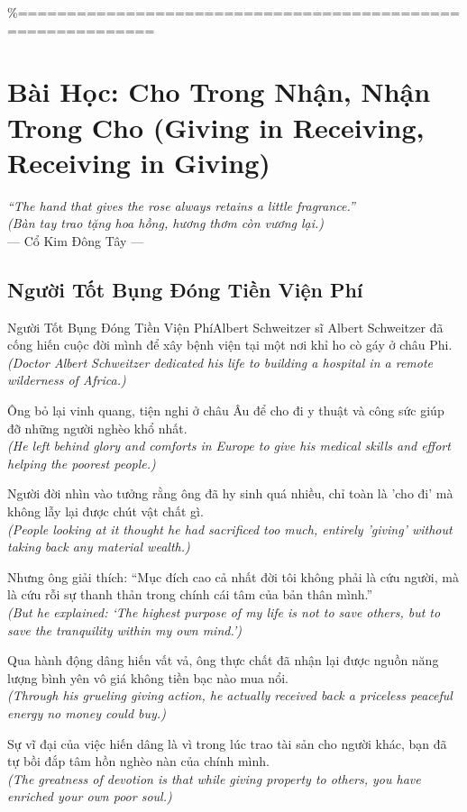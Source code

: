 \%============================================================
\chapter{Bài Học: Cho Trong Nhận, Nhận Trong Cho (Giving in Receiving, Receiving in Giving)}
\begin{center}
  \textit{\color{truyengold}``The hand that gives the rose always retains a little fragrance.''}\\[4pt]
  \textit{(Bàn tay trao tặng hoa hồng, hương thơm còn vương lại.)}\\[4pt]
  \small\color{truyenblue}--- Cổ Kim Đông Tây ---
\end{center}
\ngancach

\section{Người Tốt Bụng Đóng Tiền Viện Phí}
\begin{truyen}{Người Tốt Bụng Đóng Tiền Viện Phí}{Albert Schweitzer}
 sĩ Albert Schweitzer đã cống hiến cuộc đời mình để xây bệnh viện tại một nơi khỉ ho cò gáy ở châu Phi.\\[4pt]
\textit{(Doctor Albert Schweitzer dedicated his life to building a hospital in a remote wilderness of Africa.)}

Ông bỏ lại vinh quang, tiện nghi ở châu Âu để cho đi y thuật và công sức giúp đỡ những người nghèo khổ nhất.\\[4pt]
\textit{(He left behind glory and comforts in Europe to give his medical skills and effort helping the poorest people.)}

Người đời nhìn vào tưởng rằng ông đã hy sinh quá nhiều, chỉ toàn là 'cho đi' mà không lẫy lại được chút vật chất gì.\\[4pt]
\textit{(People looking at it thought he had sacrificed too much, entirely 'giving' without taking back any material wealth.)}

Nhưng ông giải thích: ``Mục đích cao cả nhất đời tôi không phải là cứu người, mà là cứu rỗi sự thanh thản trong chính cái tâm của bản thân mình.''\\[4pt]
\textit{(But he explained: `The highest purpose of my life is not to save others, but to save the tranquility within my own mind.')}

Qua hành động dâng hiến vất vả, ông thực chất đã nhận lại được nguồn năng lượng bình yên vô giá không tiền bạc nào mua nổi.\\[4pt]
\textit{(Through his grueling giving action, he actually received back a priceless peaceful energy no money could buy.)}

\end{truyen}
\begin{baihoc}
  Sự vĩ đại của việc hiến dâng là vì trong lúc trao tài sản cho người khác, bạn đã tự bồi đắp tâm hồn nghèo nàn của chính mình.\\[4pt]
  \textit{(The greatness of devotion is that while giving property to others, you have enriched your own poor soul.)}
\end{baihoc}

